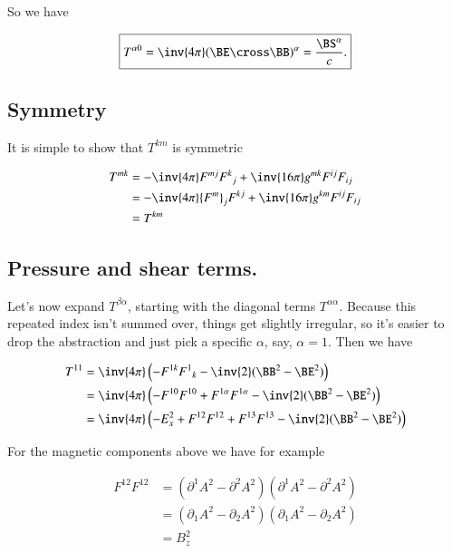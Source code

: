 So we have

\begin{equation}\label{eqn:relativisticElectrodynamicsPS6:220}
\boxed{
T^{\alpha 0} = \inv{4 \pi} (\BE \cross \BB)^\alpha = \frac{\BS^\alpha}{c}.
}
\end{equation}

\subsection{Symmetry}

It is simple to show that $T^{k m}$ is symmetric

\begin{align*}
T^{m k} 
&= -\inv{4\pi} F^{m j} {F^{k}}_j + \inv{16 \pi} g^{m k} F^{i j} F_{i j} \\
&= -\inv{4\pi} {F^{m}}_j F^{k j} + \inv{16 \pi} g^{k m} F^{i j} F_{i j} \\
&= T^{k m}
\end{align*}

\subsection{Pressure and shear terms.}

Let's now expand $T^{\beta \alpha}$, starting with the diagonal terms $T^{\alpha\alpha}$.  Because this repeated index isn't summed over, things get slightly irregular, so it's easier to drop the abstraction and just pick a specific $\alpha$, say, $\alpha = 1$.  Then we have

\begin{align*}
T^{1 1} 
&= \inv{4 \pi} \left( - F^{1 k} {F^1}_k - \inv{2} (\BB^2 - \BE^2) \right) \\
&= \inv{4 \pi} \left( - F^{1 0} F^{1 0} + F^{1 \alpha} F^{1 \alpha} - \inv{2} (\BB^2 - \BE^2) \right) \\
&= \inv{4 \pi} \left( 
- E_x^2
+ F^{1 2} F^{1 2}
+ F^{1 3} F^{1 3}
 - \inv{2} (\BB^2 - \BE^2) \right) \\
\end{align*}

For the magnetic components above we have for example

\begin{align*}
F^{1 2} F^{1 2} 
&=
(\partial^1 A^2 - \partial^2 A^2) (\partial^1 A^2 - \partial^2 A^2) \\
&=
(\partial_1 A^2 - \partial_2 A^2) (\partial_1 A^2 - \partial_2 A^2) \\
&=
B_z^2
\end{align*}

